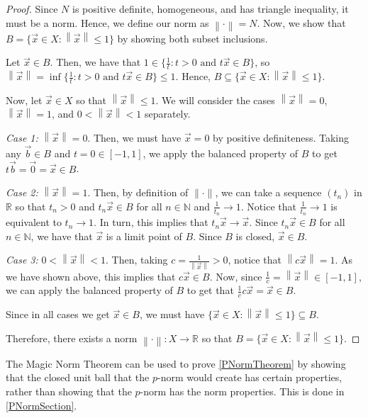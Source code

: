 \documentclass{article}
\newcommand{\N}{\mathbb{N}}
\newcommand{\R}{\mathbb{R}}
\newcommand{\norm}[1]{\left\|#1\right\|}
\theoremstyle{plain} %
\numberwithin{thm}{section} %
\theoremstyle{definition} %
\begin{document}
\begin{proof}
Since $N$ is positive definite, homogeneous, and has triangle inequality, it must be a norm. Hence, we define our norm as $\norm{\cdot} = N$. Now, we show that $B = \{\vec{x} \in X: \norm{\vec{x}} \leq 1\}$ by showing both subset inclusions.

Let $\vec{x} \in B$. Then, we have that $1 \in \{\frac{1}{t}: t > 0 \text{ and } t\vec{x} \in B\}$, so $\norm{\vec{x}} = \inf\{\frac{1}{t}: t > 0 \text{ and } t\vec{x} \in B\} \leq 1$. Hence, $B \subseteq \{\vec{x} \in X: \norm{\vec{x}} \leq 1\}$.

Now, let $\vec{x} \in X$ so that $\norm{\vec{x}} \leq 1$. We will consider the cases $\norm{\vec{x}} = 0$, $\norm{\vec{x}} = 1$, and $0 < \norm{\vec{x}} < 1$ separately.

\textit{Case 1:} $\norm{\vec{x}} = 0$. Then, we must have $\vec{x} = 0$ by positive definiteness. Taking any $\vec{b} \in B$ and $t = 0 \in [-1, 1]$, we apply the balanced property of $B$ to get $t\vec{b} = \vec{0} = \vec{x} \in B$.

\textit{Case 2:} $\norm{\vec{x}} = 1$. Then, by definition of $\|\cdot\|$, we can take a sequence $(t_n)$ in $\R$ so that $t_n > 0$ and $t_n\vec{x} \in B$ for all $n \in \N$ and $\frac{1}{t_n} \to 1$. Notice that $\frac{1}{t_n} \to 1$ is equivalent to $t_n \to 1$. In turn, this implies that $t_n\vec{x} \to \vec{x}$. Since $t_n\vec{x} \in B$ for all $n \in \N$, we have that $\vec{x}$ is a limit point of $B$. Since $B$ is closed, $\vec{x} \in B$. 

\textit{Case 3:} $0 < \norm{\vec{x}} < 1$. Then, taking $c = \frac{1}{\norm{\vec{x}}} > 0$, notice that $\norm{c\vec{x}} = 1$. As we have shown above, this implies that $c\vec{x} \in B$. Now, since $\frac{1}{c} = \norm{\vec{x}} \in [-1, 1]$, we can apply the balanced property of $B$ to get that $\frac{1}{c}c\vec{x} = \vec{x} \in B$.

Since in all cases we get $\vec{x} \in B$, we must have $\{\vec{x} \in X: \norm{\vec{x}} \leq 1\} \subseteq B$.

Therefore, there exists a norm $\norm{\cdot}: X \to \R$ so that $B = \{\vec{x} \in X: \norm{\vec{x}} \leq 1\}$.

\end{proof}

The Magic Norm Theorem can be used to prove \ref{PNormTheorem} by showing that the closed unit ball that the $p$-norm would create has certain properties, rather than showing that the $p$-norm has the norm properties. This is done in \textsection\ref{PNormSection}.
\end{document}
